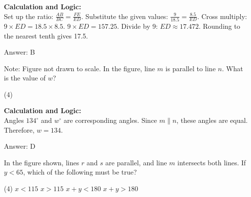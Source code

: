\documentclass[11pt,paper=a4,answers]{exam}
\begin{document}
\begin{questions}
\begin{solution}
\vspace{30pt}

\textbf{Calculation and Logic:} \\
Set up the ratio: $\frac{AB}{BC} = \frac{FE}{ED}$. Substitute the given values: $\frac{9}{18.5} = \frac{8.5}{ED}$. Cross multiply: $9 \times ED = 18.5 \times 8.5$. $9 \times ED = 157.25$. Divide by 9: $ED \approx 17.472$. Rounding to the nearest tenth gives 17.5.

\vspace{30pt}

Answer: \colorbox{yellow!100}{B}
\end{solution}

\vspace{60pt}

\question
\begin{center}
\end{center}
Note: Figure not drawn to scale. In the figure, line $m$ is parallel to line $n$. What is the value of $w$?
\begin{tasks}(4)
\end{tasks}

\begin{solution}
\textbf{Calculation and Logic:} \\
Angles $134^\circ$ and $w^\circ$ are corresponding angles. Since $m \parallel n$, these angles are equal. Therefore, $w = 134$.

\vspace{30pt}

Answer: \colorbox{yellow!100}{D}
\end{solution}

\vspace{60pt}

\question
\begin{center}
\end{center}
In the figure shown, lines $r$ and $s$ are parallel, and line $m$ intersects both lines. If $y < 65$, which of the following must be true?
\begin{tasks}(4)
    \task $x < 115$
    \task $x > 115$
    \task $x + y < 180$
    \task $x + y > 180$
\end{tasks}


\end{questions}
\end{document}
